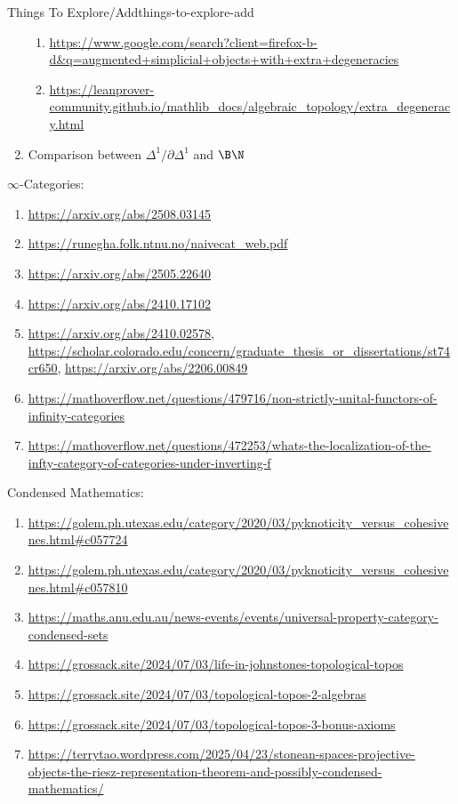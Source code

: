 \begin{remark}{Things To Explore/Add}{things-to-explore-add}
\begin{enumerate}
\begin{enumerate}
                \item \url{https://www.google.com/search?client=firefox-b-d&q=augmented+simplicial+objects+with+extra+degeneracies}
                \item \url{https://leanprover-community.github.io/mathlib_docs/algebraic_topology/extra_degeneracy.html}
            \end{enumerate}
        \item Comparison between $\Delta^{1}/\partial\Delta^{1}$ and $\B\N$
    \end{enumerate}
    $\infty$-Categories:
    \begin{enumerate}
        \item \url{https://arxiv.org/abs/2508.03145}
        \item \url{https://runegha.folk.ntnu.no/naivecat_web.pdf}
        \item \url{https://arxiv.org/abs/2505.22640}
        \item \url{https://arxiv.org/abs/2410.17102}
        \item \url{https://arxiv.org/abs/2410.02578}, \url{https://scholar.colorado.edu/concern/graduate_thesis_or_dissertations/st74cr650}, \url{https://arxiv.org/abs/2206.00849}
        \item \url{https://mathoverflow.net/questions/479716/non-strictly-unital-functors-of-infinity-categories}
        \item \url{https://mathoverflow.net/questions/472253/whats-the-localization-of-the-infty-category-of-categories-under-inverting-f}
    \end{enumerate}
    Condensed Mathematics:
    \begin{enumerate}
        \item \url{https://golem.ph.utexas.edu/category/2020/03/pyknoticity_versus_cohesivenes.html#c057724}
        \item \url{https://golem.ph.utexas.edu/category/2020/03/pyknoticity_versus_cohesivenes.html#c057810}
        \item \url{https://maths.anu.edu.au/news-events/events/universal-property-category-condensed-sets}
        \item \url{https://grossack.site/2024/07/03/life-in-johnstones-topological-topos}
        \item \url{https://grossack.site/2024/07/03/topological-topos-2-algebras}
        \item \url{https://grossack.site/2024/07/03/topological-topos-3-bonus-axioms}
        \item \url{https://terrytao.wordpress.com/2025/04/23/stonean-spaces-projective-objects-the-riesz-representation-theorem-and-possibly-condensed-mathematics/}

\end{enumerate}
\end{remark}
